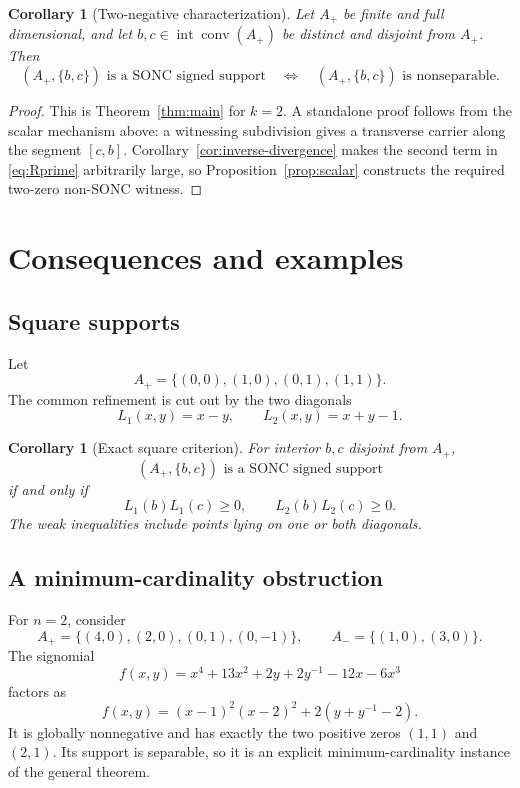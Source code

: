 \documentclass[11pt]{article}
\theoremstyle{plain}
\newtheorem{corollary}[theorem]{Corollary}
\theoremstyle{definition}
\theoremstyle{remark}
\newcommand{\conv}{\operatorname{conv}}
\begin{document}
\begin{corollary}[Two-negative characterization]\label{cor:two-negative}
Let $A_+$ be finite and full dimensional, and let $b,c\in\operatorname{int}\conv(A_+)$ be distinct and disjoint from $A_+$. Then
\[
 (A_+,\{b,c\})\text{ is a SONC signed support}
 \quad\Longleftrightarrow\quad
 (A_+,\{b,c\})\text{ is nonseparable}.
\]
\end{corollary}

\begin{proof}
This is Theorem~\ref{thm:main} for $k=2$. A standalone proof follows from the scalar mechanism above: a witnessing subdivision gives a transverse carrier along the segment $[c,b]$. Corollary~\ref{cor:inverse-divergence} makes the second term in \eqref{eq:Rprime} arbitrarily large, so Proposition~\ref{prop:scalar} constructs the required two-zero non-SONC witness.
\end{proof}

\section{Consequences and examples}

\subsection{Square supports}

Let
\[
 A_+=\{(0,0),(1,0),(0,1),(1,1)\}.
\]
The common refinement is cut out by the two diagonals
\[
 L_1(x,y)=x-y,
 \qquad
 L_2(x,y)=x+y-1.
\]

\begin{corollary}[Exact square criterion]
For interior $b,c$ disjoint from $A_+$,
\[
 (A_+,\{b,c\})\text{ is a SONC signed support}
\]
if and only if
\[
 L_1(b)L_1(c)\ge0,
 \qquad
 L_2(b)L_2(c)\ge0.
\]
The weak inequalities include points lying on one or both diagonals.
\end{corollary}

\subsection{A minimum-cardinality obstruction}

For $n=2$, consider
\[
 A_+=\{(4,0),(2,0),(0,1),(0,-1)\},
 \qquad
 A_-=\{(1,0),(3,0)\}.
\]
The signomial
\begin{equation}\label{eq:minimal-example}
 f(x,y)=x^4+13x^2+2y+2y^{-1}-12x-6x^3
\end{equation}
factors as
\[
 f(x,y)=(x-1)^2(x-2)^2+2(y+y^{-1}-2).
\]
It is globally nonnegative and has exactly the two positive zeros $(1,1)$ and $(2,1)$. Its support is separable, so it is an explicit minimum-cardinality instance of the general theorem.
\end{document}
